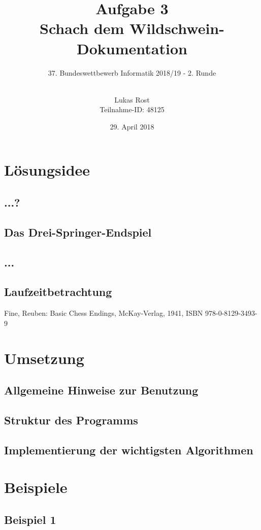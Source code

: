 \documentclass[a4paper, notitlepage, 12pt]{scrartcl}
\author{Lukas Rost \\ \small{Teilnahme-ID: 48125}}
\title{Aufgabe 3 \\ \glqq Schach dem Wildschwein\grqq  - Dokumentation}
\subtitle{37. Bundeswettbewerb Informatik 2018/19 - 2. Runde \\~\\}
\date{29. April 2018}
\begin{document}
\renewcommand{\contentsname}{\centerline{Inhaltsverzeichnis}}
 \maketitle
 \tableofcontents
 \thispagestyle{empty}
 \newpage
 \setcounter{page}{1}
 
 \section{Lösungsidee}
 \subsection{...?}
 \subsection{Das Drei-Springer-Endspiel}
 \subsection{...}
 \subsection{Laufzeitbetrachtung}
\begin{thebibliography}{xx}
 Fine, Reuben: Basic Chess Endings, McKay-Verlag, 1941, ISBN 978-0-8129-3493-9
\end{thebibliography}

\section{Umsetzung}
\subsection{Allgemeine Hinweise zur Benutzung}
\subsection{Struktur des Programms}
\subsection{Implementierung der wichtigsten Algorithmen}

\section{Beispiele}
\subsection{Beispiel 1}
\end{document}
